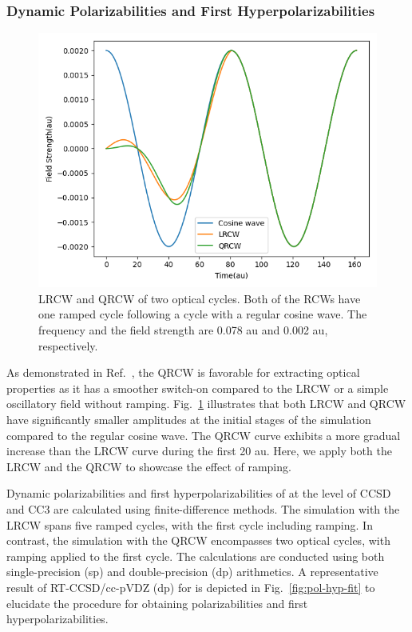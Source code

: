 \subsubsection{Dynamic Polarizabilities and First Hyperpolarizabilities}\label{results-cc3-22}
\begin{figure}
    \centering
    \includegraphics[angle=0, scale=0.43]{ch4/Figs/2-1.png}
    \caption{LRCW and QRCW of two optical cycles. Both of the RCWs have one ramped cycle following a cycle with a regular cosine wave. The frequency and the field strength are 0.078 au and 0.002 au, respectively.}
    \label{fig:rcw}
\end{figure}
As demonstrated in Ref.~, the QRCW is favorable for extracting optical properties as it has a smoother switch-on compared to the LRCW or a simple oscillatory field without ramping. Fig.~\ref{fig:rcw} illustrates that both LRCW and QRCW have significantly smaller amplitudes at the initial stages of the simulation compared to the regular cosine wave. The QRCW curve exhibits a more gradual increase than the LRCW curve during the first 20 au. Here, we apply both the LRCW and the QRCW to showcase the effect of ramping.

Dynamic polarizabilities and first hyperpolarizabilities of  at the level of CCSD and CC3 are calculated using finite-difference methods. The simulation with the LRCW spans five ramped cycles, with the first cycle including ramping. In contrast, the simulation with the QRCW encompasses two optical cycles, with ramping applied to the first cycle. The calculations are conducted using both single-precision (sp) and double-precision (dp) arithmetics. A representative result of RT-CCSD/cc-pVDZ (dp) for  is depicted in Fig.~\ref{fig:pol-hyp-fit} to elucidate the procedure for obtaining polarizabilities and first hyperpolarizabilities. 

